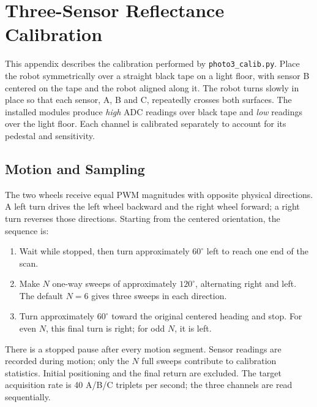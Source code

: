 \clearpage
\section{Three-Sensor Reflectance Calibration}
\label{app:photo3-calibration}

This appendix describes the calibration performed by \texttt{photo3\_calib.py}. Place the robot symmetrically over a straight black tape on a light floor, with sensor B centered on the tape and the robot aligned along it. The robot turns slowly in place so that each sensor, A, B and C, repeatedly crosses both surfaces. The installed modules produce \emph{high} ADC readings over black tape and \emph{low} readings over the light floor. Each channel is calibrated separately to account for its pedestal and sensitivity.

\subsection{Motion and Sampling}
The two wheels receive equal PWM magnitudes with opposite physical directions. A left turn drives the left wheel backward and the right wheel forward; a right turn reverses those directions. Starting from the centered orientation, the sequence is:
\begin{enumerate}
    \item Wait while stopped, then turn approximately $60^\circ$ left to reach one end of the scan.
    \item Make $N$ one-way sweeps of approximately $120^\circ$, alternating right and left. The default $N=6$ gives three sweeps in each direction.
    \item Turn approximately $60^\circ$ toward the original centered heading and stop. For even $N$, this final turn is right; for odd $N$, it is left.
\end{enumerate}
There is a stopped pause after every motion segment. Sensor readings are recorded during motion; only the $N$ full sweeps contribute to calibration statistics. Initial positioning and the final return are excluded. The target acquisition rate is 40 A/B/C triplets per second; the three channels are read sequentially.

